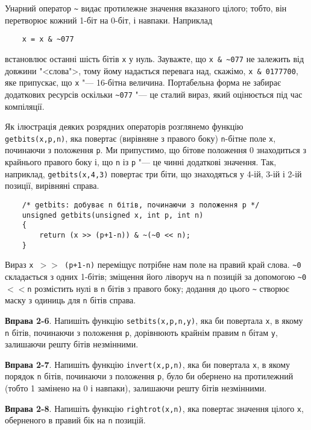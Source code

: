 \documentclass[a4paper,12pt]{book}
\begin{document}
  Унарний оператор \texttt{\~{}} видає протилежне значення вказаного цілого; тобто, він
  перетворює кожний 1-біт на 0-біт, і навпаки. Наприклад
  \begin{verbatim}
    x = x & ~077
  \end{verbatim}
  встановлює останні шість бітів \texttt{x} у нуль. Зауважте, що \texttt{x \& \~{}077} не
  залежить від довжини "<слова">, тому йому надається перевага над, скажімо,
  \texttt{x \& 0177700}, яке припускає, що \texttt{x} "--- 16-бітна величина.
  Портабельна форма не забирає додаткових ресурсів оскільки \texttt{\~{}077} "--- це
  сталий вираз, який оцінюється під час компіляції.

  Як ілюстрація деяких розрядних операторів розглянемо функцію \texttt{getbits(x,p,n)},
  яка повертає (вирівняне з правого боку) \texttt{n}-бітне поле \texttt{x}, починаючи з
  положення \texttt{p}. Ми припустимо, що бітове положення 0 знаходиться з крайнього
  правого боку і, що \texttt{n} із \texttt{p} "--- це чинні додаткові значення. Так,
  наприклад, \texttt{getbits(x,4,3)} повертає три біти, що знаходяться у 4-ій, 3-ій і 2-ій
  позиції, вирівняні справа.

  \begin{verbatim}
    /* getbits: добуває n бітів, починаючи з положення p */
    unsigned getbits(unsigned x, int p, int n)
    {
        return (x >> (p+1-n)) & ~(~0 << n);
    }
  \end{verbatim}

  Вираз \texttt{x \mbox{$>$}\mbox{$>$} (p+1-n)} переміщує потрібне нам поле на правий край слова.
  \texttt{\~{}0} складається з одних 1-бітів; зміщення його ліворуч на \texttt{n} позицій за
  допомогою \texttt{\~{}0\mbox{$<$}\mbox{$<$}n} розмістить нулі в \texttt{n} бітів з правого боку;
  додання до цього \texttt{\~{}} створює маску з одиниць для \texttt{n} бітів справа.

  \textbf{Вправа 2-6}. Напишіть функцію \texttt{setbits(x,p,n,y)}, яка би повертала
  \texttt{x}, в якому \texttt{n} бітів, починаючи з положення \texttt{p}, дорівнюють
  крайнім правим \texttt{n} бітам \texttt{y}, залишаючи решту бітів незмінними.

  \textbf{Вправа 2-7}. Напишіть функцію \texttt{invert(x,p,n)}, яка би повертала \texttt{x},
  в якому порядок \texttt{n} бітів, починаючи з положення \texttt{p}, було би обернено на
  протилежний (тобто 1 замінено на 0 і навпаки), залишаючи решту бітів незмінними.

  \textbf{Вправа 2-8}. Напишіть функцію \texttt{rightrot(x,n)}, яка повертає значення цілого
  \texttt{x}, оберненого в правий бік на \texttt{n} позицій.
\end{document}

